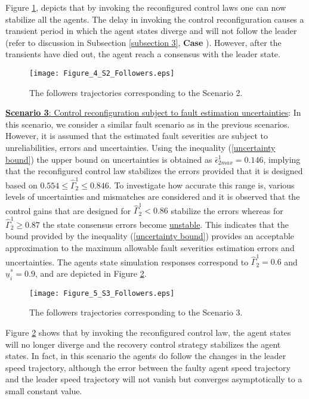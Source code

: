 \documentclass[12pt,draftcls,onecolumn]{IEEEtran}
\newcommand{\RNum}[1]{\uppercase\expandafter{\romannumeral #1\relax}}
\begin{document}
\par
   Figure \ref{followers trajectory S2}, depicts  that by invoking the reconfigured control laws one can now stabilize all the agents. 
   The delay in invoking the control reconfiguration causes a transient period in which the agent states diverge and will not follow the leader (refer to discussion in Subsection \ref{subsection 3}, \textbf{Case \RNum{5}}). However, after the transients have died out, the agent reach a consensus with the leader state.   \par
      \begin{figure}[thpb]
      \centering
            \texttt{[image: Figure\_4\_S2\_Followers.eps]}
      \caption{ The followers trajectories corresponding to the Scenario 2.}     
      \label{followers trajectory S2}
   \end{figure}    
  \underline{  \textbf{Scenario 3}: Control reconfiguration subject to fault estimation uncertainties}: In this scenario, we  consider a similar  fault scenario as in the previous scenarios. However, it is assumed that the estimated fault severities are subject to unreliabilities, errors and uncertainties. Using the inequality (\ref{uncertainty bound}) the upper bound on  uncertainties is obtained as $ \bar{\epsilon}_{2max}^1=0.146$, implying that  the reconfigured control law stabilizes the errors provided that it  is designed based on $0.554\leq\hat{\Gamma}_2^1\leq0.846$. To investigate  how accurate this range is, 
   various levels of uncertainties and mismatches are considered and it is observed that the control gains that are designed for   {$\hat{\Gamma}_2^1< 0.86$} stabilize the errors whereas for {$\hat{\Gamma}_2^1\geq 0.87$} the state consensus errors become \underline{unstable}. This indicates that the bound  provided by the inequality (\ref{uncertainty bound}) provides  an acceptable approximation to the maximum allowable fault severities estimation errors and uncertainties. The  agents state simulation responses correspond to 
 $\hat\Gamma_2^1=0.6$ and $\hat{\underline{u}}_i^s=0.9$, and are depicted in Figure \ref{followers trajectory S3}.\par
       \begin{figure}[thpb]
      \centering
            \texttt{[image: Figure\_5\_S3\_Followers.eps]}
      \caption{ The followers trajectories corresponding to the Scenario 3.}     
      \label{followers trajectory S3}
   \end{figure}  
 Figure \ref{followers trajectory S3} shows that by invoking the reconfigured control law, the agent states will no longer diverge and the recovery control strategy stabilizes the agent states. In fact, in this scenario the agents do follow the changes in the leader speed  trajectory, although the error between the faulty agent speed trajectory and the leader speed trajectory will not vanish but converges asymptotically to a small constant value. 
 
\end{document}
